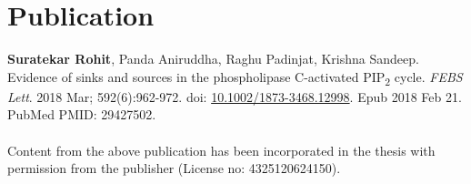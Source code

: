 \chapter[Publication]{\centering Publication}

\textbf{Suratekar Rohit}, Panda Aniruddha, Raghu Padinjat, Krishna Sandeep. Evidence of sinks and sources in the phospholipase C-activated PIP\textsubscript{2} cycle.\textit{ FEBS Lett}. 2018 Mar; 592(6):962-972. doi: \href{https://doi.org/10.1002/1873-3468.12998}{10.1002/1873-3468.12998}. Epub 2018 Feb 21. PubMed PMID: 29427502.
\\\\
{\footnotesize Content from the above publication has been incorporated in the thesis with permission from the publisher (License no: 4325120624150).}